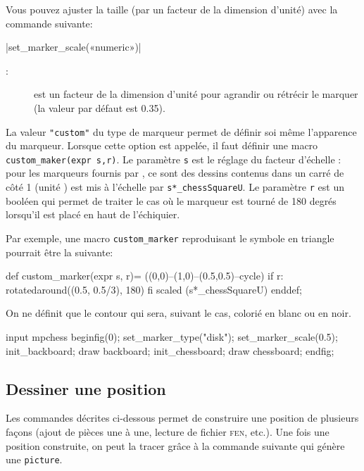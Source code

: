 \documentclass[french]{ltxdoc}
\begin{document}
Vous pouvez ajuster la taille (par un facteur de la dimension d’unité) avec la
commande suivante:

\commande|set_marker_scale(«numeric»)|\smallskip

\begin{description}
  \item[:] est un facteur de la dimension d’unité pour agrandir ou
  rétrécir le marquer (la valeur par défaut est \num{0.35}).
\end{description}

La valeur \lstinline+"custom"+ du type de marqueur permet de définir soi même
l’apparence du marqueur. Lorsque cette option est appelée, il faut définir une
macro \MP{} \lstinline+custom_maker(expr s,r)+. Le paramètre \lstinline+s+ est
le réglage du facteur d’échelle : pour les marqueurs fournis par \mpchess, ce
sont des dessins contenus dans un carré de côté 1 (unité \MP) est mis à
l’échelle par \lstinline+s*_chessSquareU+. Le paramètre \lstinline+r+ est un
booléen qui permet de traiter le cas où le marqueur est tourné de 180 degrés
lorsqu’il est placé en haut de l’échiquier. 

Par exemple, une macro \lstinline+custom_marker+ reproduisant le symbole en
triangle pourrait être la suivante:
\begin{mpcode}
def custom_marker(expr s, r)=
  ((0,0)--(1,0)--(0.5,0.5)--cycle) if r: rotatedaround((0.5, 0.5/3), 180) fi scaled (s*_chessSquareU)
enddef;
\end{mpcode}

On ne définit que le contour qui sera, suivant le cas, colorié en blanc ou en
noir. 

\begin{ExempleMP}
input mpchess
beginfig(0);
set_marker_type("disk");
set_marker_scale(0.5);
init_backboard;
draw backboard;
init_chessboard;
draw chessboard;
endfig;
\end{ExempleMP}

\subsection{Dessiner une position}

Les commandes décrites ci-dessous permet de construire une position de plusieurs
façons (ajout de pièces une à une, lecture de fichier \textsc{fen}, etc.). Une
fois une position construite, on peut la tracer grâce à la commande suivante qui
génère une \lstinline+picture+.
\end{document}
